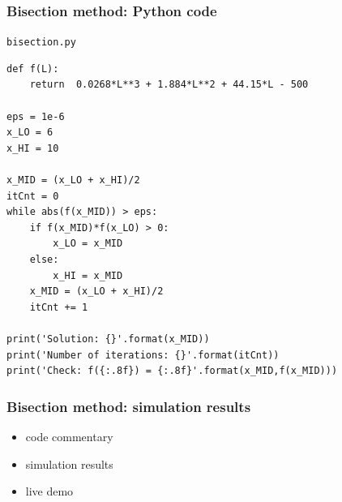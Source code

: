 \documentclass[english,14pt]{beamer}
\begin{document}
\begin{frame}[fragile]

\frametitle{Bisection method: Python code}
\vspace*{-4mm}
{\small \texttt{bisection.py}}
\vspace*{-2mm}
\begin{lstlisting}[style=CStyle,basicstyle=\scriptsize]
def f(L):
    return  0.0268*L**3 + 1.884*L**2 + 44.15*L - 500

eps = 1e-6
x_LO = 6
x_HI = 10

x_MID = (x_LO + x_HI)/2
itCnt = 0
while abs(f(x_MID)) > eps:
    if f(x_MID)*f(x_LO) > 0:
        x_LO = x_MID
    else:
        x_HI = x_MID
    x_MID = (x_LO + x_HI)/2
    itCnt += 1

print('Solution: {}'.format(x_MID))
print('Number of iterations: {}'.format(itCnt))
print('Check: f({:.8f}) = {:.8f}'.format(x_MID,f(x_MID)))
\end{lstlisting}

\end{frame}


\begin{frame}[fragile]

\frametitle{Bisection method: simulation results}

\begin{itemize}
	\item code commentary
	\item simulation results
	\item live demo
\end{itemize}

\end{frame}

\end{document}
